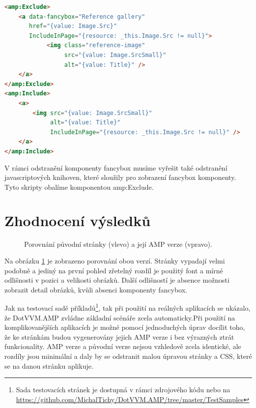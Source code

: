 \begin{lstlisting}[language=html, caption=Odstranění komponenty fancybox.,label=fancybox,captionpos=t]
<amp:Exclude>
	<a data-fancybox="Reference gallery"
	   href="{value: Image.Src}"
	   IncludeInPage="{resource: _this.Image.Src != null}">
	        <img class="reference-image"
	             src="{value: Image.SrcSmall}"
	             alt="{value: Title}" />
	</a>
</amp:Exclude>
<amp:Include>
	<a>
		<img src="{value: Image.SrcSmall}"
		     alt="{value: Title}"
		     IncludeInPage="{resource: _this.Image.Src != null}" />
	</a>
</amp:Include>

\end{lstlisting}

V rámci odstranění komponenty fancybox musíme vyřešit také odstranění javascriptových knihoven, které sloužily pro zobrazení fancybox komponenty. Tyto skripty obalíme komponentou amp:Exclude.


\section*{Zhodnocení výsledků}

\begin{figure}[hbt]
\hspace{-20px}
	\caption{Porovnání původní stránky (vlevo) a její AMP verze (vpravo).}
	\label{originalVSamp}
\end{figure}

Na obrázku \ref{originalVSamp} je zobrazeno porovnání obou verzí. Stránky vypadají velmi podobně a jediný na první pohled zřetelný rozdíl je použitý font a mírné odlišnosti v pozici a velikosti obrázků. Další odlišností je absence možnosti zobrazit detail obrázků, kvůli absenci komponenty fancybox.

Jak na testovací sadě příkladů\footnote{ Sada testovacích stránek je dostupná v rámci zdrojového kódu nebo na \url{https://github.com/MichalTichy/DotVVM.AMP/tree/master/TestSamples}}, tak při použití na reálných aplikacích se ukázalo, že DotVVM.AMP zvládne základní scénáře zcela automaticky.Při použití na komplikovanějších aplikacích je možné pomocí jednoduchých úprav docílit toho, že ke stránkám budou vygenerovány jejich AMP verze i bez výrazných ztrát funkcionality. AMP verze a původní verze nejsou vzhledově zcela identické, ale rozdíly jsou minimální a daly by se odstranit malou úpravou stránky a CSS, které se na danou stránku aplikuje.

